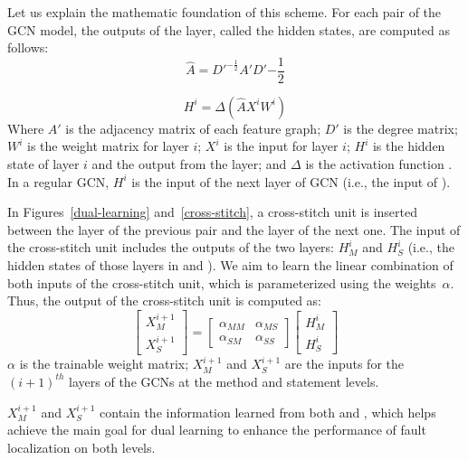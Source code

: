  Let us explain the mathematic foundation
of this scheme. For each pair of the GCN model, the outputs of the
 layer, called the hidden states, are computed as follows:
\begin{equation}\label{eq:1}
	\hat{A} = D'^{-\frac{1}{2}}A'D'{-\frac{1}{2}}
\end{equation}

\begin{equation}\label{eq:2}
	H^{i} = \Delta(\hat{A}X^{i}W^{i})
\end{equation}
Where $A'$ is the adjacency matrix of each feature graph; $D'$ is the
degree matrix; $W^{i}$ is the weight matrix for layer $i$; $X^{i}$ is
the input for layer $i$; $H^{i}$ is the hidden state of layer $i$ and
the output from the  layer; and $\Delta$ is the activation
function .
In a regular GCN, $H^{i}$ is the input of the next layer of GCN (i.e.,
the input of ).

In Figures~\ref{dual-learning} and~\ref{cross-stitch}, a cross-stitch
unit is inserted between the  layer of the previous pair
and the  layer of the next one. The input of the
cross-stitch unit includes the outputs of the two  layers:
$H_M^i$ and $H_S^i$ (i.e., the hidden states of those layers in
 and ). We aim to learn the linear
combination of both inputs of the cross-stitch unit, which is
parameterized using the weights~$\alpha$.
%
Thus, the output of the cross-stitch unit is computed as:
\begin{equation}\label{cross-stitch-formula}
	\begin{bmatrix}
		X_M^{i+1}\\
		X_S^{i+1}
	\end{bmatrix}
        =
        \begin{bmatrix}
		\alpha_{MM} &  \alpha_{MS} \\
		\alpha_{SM} &  \alpha_{SS}
	\end{bmatrix}
	\begin{bmatrix}
		H_M^{i}\\
		H_S^{i}
	\end{bmatrix}
\end{equation}
$\alpha$ is the trainable weight matrix; $X_M^{i+1}$ and
$X_S^{i+1}$ are the inputs for the $(i+1)^{th}$ layers of the GCNs at the
method and statement levels.

$X_M^{i+1}$ and $X_S^{i+1}$ contain the information learned from both
 and , which helps achieve the main goal for
dual learning to enhance the performance of fault localization on both
levels.

